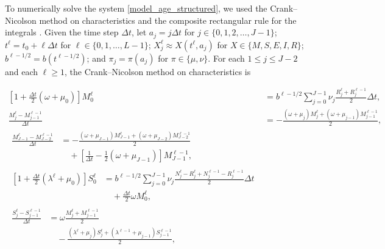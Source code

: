 \documentclass{jpmarticle}
\let\subequationsorig\subequations%
\let\endsubequationsorig\endsubequations%
\renewenvironment{subequations}{
  \subequationsorig
  \renewcommand{\theequation}{\theparentequation.\arabic{equation}}
}{
  \endsubequationsorig
}
\begin{document}
To numerically solve the system \eqref{model_age_structured}, we used
the Crank--Nicolson method on characteristics and the composite
rectangular rule for the integrals \autocite{milner_1992}.  Given the
time step $\Delta t$, let
$a_j = j \Delta t$ for $j \in \{0, 1, 2, \ldots, J - 1\}$;
$t^{\ell} = t_0 + \ell \Delta t$ for $\ell \in \{0, 1, \ldots, L - 1\}$;
$X_j^{\ell} \approx X(t^{\ell}, a_j)$ for $X \in \{M, S, E, I, R\}$;
$b^{\ell - 1 / 2} = b(t^{\ell - 1 / 2})$; and
$\pi_j = \pi(a_j)$ for $\pi \in \{\mu, \nu\}$.
For each $1 \leq j \leq J - 2$ and each $\ell \geq 1$, the
Crank--Nicolson method on characteristics is
\begin{subequations}
  \label{numerics_age_structured}
  \begin{align}
    \left[1 + \frac{\Delta t}{2} (\omega + \mu_0)\right]
    M_0^{\ell}
    &= b^{\ell - 1 / 2}
    \sum_{j = 0}^{J - 1} \nu_j \frac{R_j^{\ell} + R_j^{\ell - 1}}{2}
    \Delta t,
    \\
    \frac{M_j^{\ell} - M_{j - 1}^{\ell - 1}}{\Delta t} &=
    - \frac{(\omega + \mu_j) M_j^{\ell}
      + (\omega + \mu_{j - 1}) M_{j - 1}^{\ell - 1}}{2},
    \\
    \begin{split}
      \frac{M_{J - 1}^{\ell} - M_{J - 2}^{\ell - 1}}{\Delta t} &=
      - \frac{(\omega + \mu_{J - 1}) M_{J - 1}^{\ell}
        + (\omega + \mu_{J - 2}) M_{J - 2}^{\ell - 1}}{2}
      \\ & \quad {}
      + \left[
        \frac{1}{\Delta t} - \frac{1}{2} (\omega + \mu_{J - 1})
      \right] M_{J - 1}^{\ell - 1},
    \end{split}
    \\
    \begin{split}
      \left[1 + \frac{\Delta t}{2} (\lambda^{\ell} + \mu_0)\right] S_0^{\ell}
      &= b^{\ell - 1 / 2}
      \sum_{j = 0}^{J - 1}
      \nu_j
      \frac{N_j^{\ell} - R_j^{\ell} + N_j^{\ell - 1} - R_j^{\ell - 1}}{2}
      \Delta t
      \\ & \quad {}
      + \frac{\Delta t}{2} \omega M_0^{\ell},
    \end{split}
    \\
    \begin{split}
      \frac{S_j^{\ell} - S_{j - 1}^{\ell - 1}}{\Delta t} &=
      \omega \frac{M_j^{\ell} + M_{j - 1}^{\ell - 1}}{2}
      \\ & \quad {}
      - \frac{(\lambda^{\ell} + \mu_j) S_j^{\ell}
        + (\lambda^{\ell - 1} + \mu_{j - 1}) S_{j - 1}^{\ell - 1}}{2},
    \end{split}

\end{align}
\end{subequations}
\end{document}
